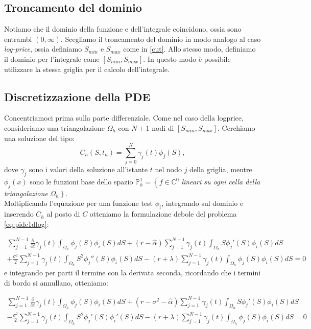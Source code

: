 \documentclass[a4paper,10pt]{report}
\theoremstyle{plain}
\theoremstyle{definition}
\theoremstyle{remark}
\begin{document}
\subsection{Troncamento del dominio}

Notiamo che il dominio della funzione e dell'integrale coincidono, ossia sono entrambi $(0,\infty)$.
Scegliamo il troncamento del dominio in modo analogo al caso \emph{log-price}, ossia definiamo $S_{min}$ e $S_{max}$ come in \eqref{cut}. Allo stesso modo, definiamo il dominio per l'integrale come $[S_{min},S_{max}]$. In questo modo è possibile utilizzare la stessa griglia per il calcolo dell'integrale.

\subsection{Discretizzazione della PDE}
Concentriamoci prima sulla parte differenziale. Come nel caso della logprice, consideriamo una triangolazione $\Omega_h$ con $N+1$ nodi di $[S_{min},S_{max}]$. Cerchiamo una soluzione del tipo: $$C_h(S,t_n)=\sum_{j=0}^{N}\gamma_j(t)\phi_j(S),$$ dove $\gamma_j$ sono i valori della soluzione all'istante $t$ nel nodo $j$ della griglia, mentre $\phi_j(x)$ sono le funzioni base dello spazio $\mathbb{P}_h^1=\left\{f\in\mathbb{C}^0\right.$ \emph{lineari su ogni cella della triangolazione} $\Omega_h\left.\right\}$.\\
Moltiplicando l'equazione per una funzione test $\phi_i$, integrando sul dominio e inserendo $C_h$ al posto di $C$ otteniamo la formulazione debole del problema \eqref{eq:pide1dlog}:

\begin{multline*}
\sum_{j=1}^{N-1}\frac{\partial}{\partial t}\gamma_j(t)\int_{\Omega_h}\phi_j(S)\phi_i(S)dS+(r-\hat{\alpha})\sum_{j=1}^{N-1}\gamma_j(t)\int_{\Omega_h}S\phi_j'(S)\phi_i(S)dS\\
+\frac{\sigma^2}{2} \sum_{j=1}^{N-1} \gamma_j(t)\int_{\Omega_h} S^2 \phi_j''(S)\phi_i(S)dS -(r+\lambda) \sum_{j=1}^{N-1}\gamma_j(t)\int_{\Omega_h}\phi_j(S)\phi_i(S)dS=0
\end{multline*}
e integrando per parti il termine con la derivata seconda, ricordando che i termini di bordo si annullano, otteniamo:

\begin{multline*}
\sum_{j=1}^{N-1}\frac{\partial}{\partial t}\gamma_j(t)\int_{\Omega_h}\phi_j(S)\phi_i(S)dS
+(r-\sigma^2-\hat{\alpha})\sum_{j=1}^{N-1}\gamma_j(t)\int_{\Omega_h}S\phi_j'(S)\phi_i(S)dS\\
-\frac{\sigma^2}{2}\sum_{j=1}^{N-1} \gamma_j(t)\int_{\Omega_h} S^2\phi_j'(S)\phi_i'(S)dS
-(r+\lambda)\sum_{j=1}^{N-1}\gamma_j(t)\int_{\Omega_h}\phi_j(S)\phi_i(S)dS=0
\end{multline*}
\end{document}
